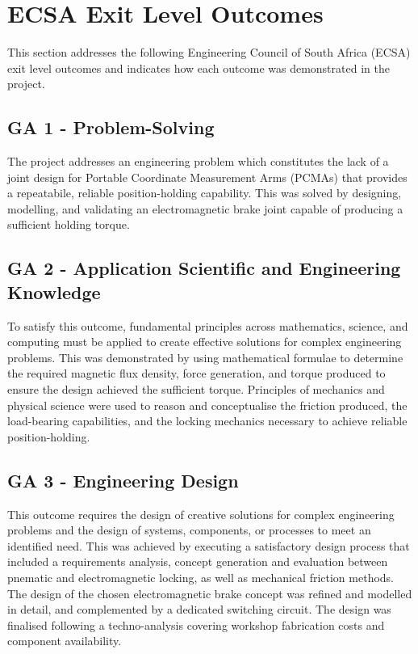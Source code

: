 \chapter{ECSA Exit Level Outcomes}

This section addresses the following Engineering Council of South Africa (ECSA) exit level outcomes and indicates how each outcome was demonstrated in the project.

\section*{GA 1 - Problem-Solving}

The project addresses an engineering problem which constitutes the lack of a joint design for Portable Coordinate Measurement Arms (PCMAs) that provides a repeatabile, reliable position-holding capability. This was solved by designing, modelling, and validating an electromagnetic brake joint capable of producing a sufficient holding torque.

\section*{GA 2 - Application Scientific and Engineering Knowledge}

To satisfy this outcome, fundamental principles across mathematics, science, and computing must be applied to create effective solutions for complex engineering problems. This was demonstrated by using mathematical formulae to determine the required magnetic flux density, force generation, and torque produced to ensure the design achieved the sufficient torque. Principles of mechanics and physical science were used to reason and conceptualise the friction produced, the load-bearing capabilities, and the locking mechanics necessary to achieve reliable position-holding.

\section*{GA 3 - Engineering Design}

This outcome requires the design of creative solutions for complex engineering problems and the design of systems, components, or processes to meet an identified need. This was achieved by executing a satisfactory design process that included a requirements analysis, concept generation and evaluation between pnematic and electromagnetic locking, as well as mechanical friction methods. The design of the chosen electromagnetic brake concept was refined and modelled in detail, and complemented by a dedicated switching circuit. The design was finalised following a techno-analysis covering workshop fabrication costs and component availability.

